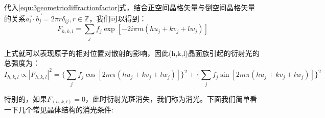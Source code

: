 \documentclass{ctexart}
\begin{document}
        代入\eqref{equ:3geometricdiffractionfactor}式，结合正空间晶格矢量与倒空间晶格矢量的关系$\vec{a_i}\cdot\vec{b_j}=2\pi r\delta_{ij},r\in \mathbb{Z}$，我们可以得到：
        \begin{equation}
             F_{h,k,l}=\sum_j f_j \exp{[-2i\pi m(hu_j+kv_j+lw_j)]}
        \end{equation}
        
        上式就可以表现原子的相对位置对散射的影响，因此(h,k,l)晶面族引起的衍射光的总强度为：
        \begin{equation}
            I_{h,k,l}\propto |F_{h,k,l}|^2=\{\sum_j f_j\cos{[2m\pi(hu_j+kv_j+lw_j)]}\}^2+\{\sum_j f_j\sin{[2m\pi(hu_j+kv_j+lw_j)]}\}^2
        \end{equation}
        
        特别的，如果$F_{(h,k,l)}=0$，此时衍射光斑消失，我们称为消光。下面我们简单看一下几个常见晶体结构的消光条件:
\end{document}
